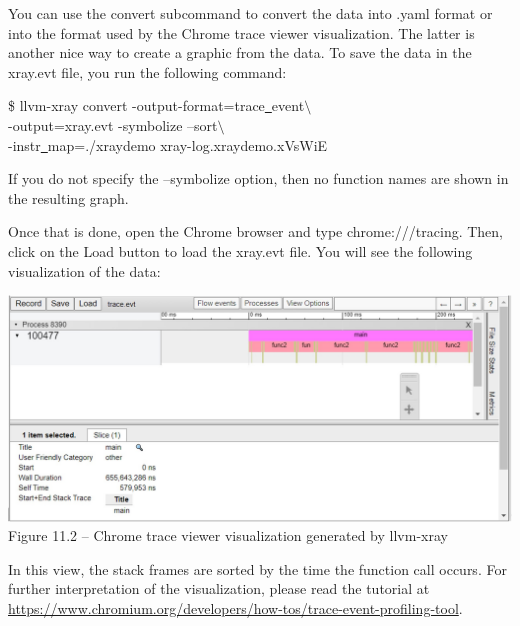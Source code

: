 You can use the convert subcommand to convert the data into .yaml format or into the format used by the Chrome trace viewer visualization. The latter is another nice way to create a graphic from the data. To save the data in the xray.evt file, you run the following command:\par

\begin{tcolorbox}[colback=white,colframe=black]
\$ llvm-xray convert -output-format=trace\underline{~}event$\setminus$ \\
\hspace*{0.5cm}-output=xray.evt -symbolize –sort$\setminus$ \\
\hspace*{0.5cm}-instr\underline{~}map=./xraydemo xray-log.xraydemo.xVsWiE
\end{tcolorbox}

If you do not specify the –symbolize option, then no function names are shown in the resulting graph.\par

Once that is done, open the Chrome browser and type chrome:///tracing. Then, click on the Load button to load the xray.evt file. You will see the following visualization of the data:\par

\hspace*{\fill} \par %
\begin{center}
\includegraphics[width=1\textwidth]{content/3/chapter11/images/2.jpg}\\
Figure 11.2 – Chrome trace viewer visualization generated by llvm-xray
\end{center}

In this view, the stack frames are sorted by the time the function call occurs. For further interpretation of the visualization, please read the tutorial at \url{https://www.chromium.org/developers/how-tos/trace-event-profiling-tool}.

